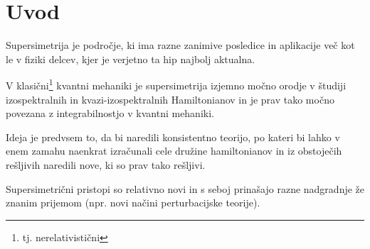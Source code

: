 \section{Uvod}

Supersimetrija je podro\v cje, ki ima razne zanimive posledice in aplikacije ve\v c kot le v fiziki
delcev, kjer je verjetno ta hip najbolj aktualna.

V klasi\v cni\footnote{tj. nerelativisti\v cni} kvantni mehaniki je supersimetrija izjemno mo\v cno orodje v \v studiji
izospektralnih in kvazi-izospektralnih Hamiltonianov in je prav tako mo\v cno povezana z integrabilnostjo v kvantni
mehaniki.

Ideja je predvsem to, da bi naredili konsistentno teorijo, po kateri bi lahko v enem zamahu naenkrat izra\v cunali
cele dru\v zine hamiltonianov in iz obstoje\v cih re\v sljivih naredili nove, ki so prav tako re\v sljivi.

Supersimetri\v cni pristopi so relativno novi in s seboj prina\v sajo razne nadgradnje \v ze znanim prijemom
(npr. novi na\v cini perturbacijske teorije).
